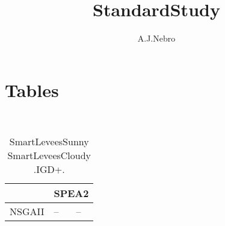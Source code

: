 \documentclass{article}
\title{StandardStudy}
\author{A.J.Nebro}
\begin{document}
\maketitle
\section{Tables}
\
\begin{table}
\caption{
SmartLeveesSunny SmartLeveesCloudy 
.IGD+.}
\label{Table:
SmartLeveesSunny SmartLeveesCloudy 
.IGD+.}
\centering
\begin{scriptsize}
\begin{tabular}{
| l | p{0.15cm }p{0.15cm } | 
}
\hline \multicolumn{1}{|c|}{} & \multicolumn{2}{c|}{SPEA2} \\
\hline 
NSGAII
 & 
--
&
--
 \\ 
\hline
\end{tabular}
\end{scriptsize}
\end{table}
\end{document}
